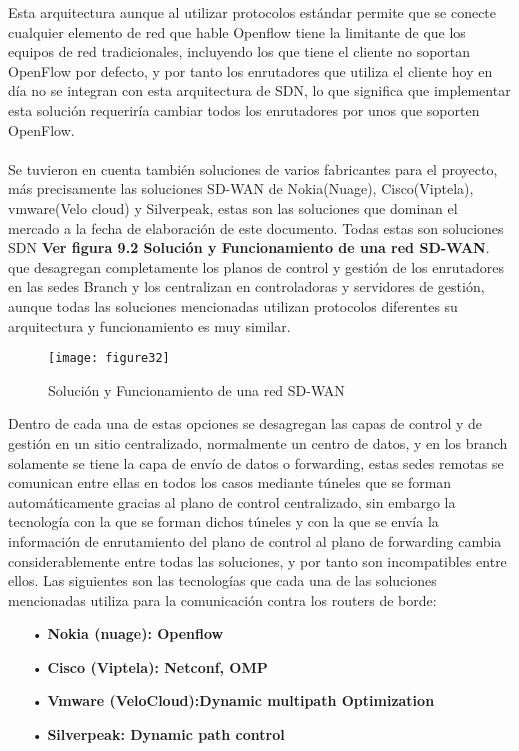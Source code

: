 Esta arquitectura aunque al utilizar protocolos estándar permite que se conecte cualquier elemento de red que hable Openflow tiene la limitante de que los equipos de red tradicionales, incluyendo los que tiene el cliente no soportan OpenFlow por defecto, y por tanto los enrutadores que utiliza el cliente hoy en día no se integran con esta arquitectura de SDN, lo que significa que implementar esta solución requeriría cambiar todos los enrutadores por unos que soporten OpenFlow.
\\
\\
Se tuvieron en cuenta también soluciones de varios fabricantes para el proyecto, más precisamente las soluciones SD-WAN de Nokia(Nuage), Cisco(Viptela), vmware(Velo cloud) y Silverpeak, estas son las soluciones que dominan el mercado a la fecha de elaboración de este documento. Todas estas son soluciones SDN \textbf{Ver figura 9.2 Solución y Funcionamiento de una red SD-WAN}. que desagregan completamente los planos de control y gestión de los enrutadores en las sedes Branch y los centralizan en controladoras y servidores de gestión, aunque todas las soluciones mencionadas utilizan protocolos diferentes su arquitectura y funcionamiento es muy similar.
\begin{figure}[htbp]
  \centering
    {\texttt{[image: figure32]}}%
  \caption{Solución y Funcionamiento de una red SD-WAN}
  \label{fig:fig2subfig}
\end{figure}
Dentro de cada una de estas opciones se desagregan las capas de control y de gestión en un sitio centralizado, normalmente un centro de datos, y en los branch solamente se tiene la capa de envío de datos o forwarding, estas sedes remotas se comunican entre ellas en todos los casos mediante túneles que se forman automáticamente gracias al plano de control centralizado, sin embargo la tecnología con la que se forman dichos túneles y con la que se envía la información de enrutamiento del plano de control al plano de forwarding cambia considerablemente entre todas las soluciones, y por tanto son incompatibles entre ellos. Las siguientes son las tecnologías que cada una de las soluciones mencionadas utiliza para la comunicación contra los routers de borde:
\begin{itemize}
\item[•]\textbf{Nokia (nuage): Openflow}
\item[•]\textbf{Cisco (Viptela): Netconf, OMP}
\item[•]\textbf{Vmware (VeloCloud):Dynamic multipath Optimization}
\item[•]\textbf{Silverpeak: Dynamic path control}
\end{itemize}
